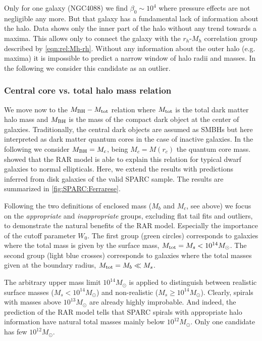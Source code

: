 Only for one galaxy (NGC4088) we find $\beta_0 \sim 10^{4}$ where pressure effects are not negligible any more. But that galaxy has a fundamental lack of information about the halo. Data shows only the inner part of the halo without any trend towards a maxima. This allows only to connect the galaxy with the $r_h$-$M_h$ correlation group described by \cref{eqn:rel:Mh-rh}. Without any information about the outer halo (e.g. maxima) it is impossible to predict a narrow window of halo radii and masses. In the following we consider this candidate as an outlier.




\subsubsection{Central core vs. total halo mass relation}
We move now to the $M_{\rm BH} - M_{\rm tot}$ relation \citep{2002ApJ...578...90F,2011Natur.469..377K,2015ApJ...800..124B} where $M_{\rm tot}$ is the total dark matter halo mass and $M_{\rm BH}$ is the mass of the compact dark object at the center of galaxies. Traditionally, the central dark objects are assumed as SMBHs but here interpreted as dark matter quantum cores in the case of inactive galaxies. In the following we consider $M_{\rm BH} = M_c$, being $M_c = M(r_c)$ the quantum core mass. \citet{RAR-II} showed that the RAR model is able to explain this relation for typical dwarf galaxies to normal ellipticals. Here, we extend the results with predictions inferred from disk galaxies of the valid SPARC sample. The results are summarized in \cref{fig:SPARC:Ferrarese}.

Following the two definitions of enclosed mass ($M_b$ and $M_c$, see above) we focus on the \textit{appropriate} and \textit{inappropriate} groups, excluding flat tail fits and outliers, to demonstrate the natural benefits of the RAR model. Especially the importance of the cutoff parameter $W_0$. The first group (green circles) corresponds to galaxies where the total mass is given by the surface mass, $M_{\rm tot} = M_s < 10^{14} M_\odot$. The second group (light blue crosses) corresponds to galaxies where the total masses given at the boundary radius, $M_{\rm tot} = M_b \ll M_s$.

The arbitrary upper mass limit $10^{14} M_\odot$ is applied to distinguish between realistic surface masses ($M_s < 10^{14} M_\odot$) and non-realistic ($M_s \geq 10^{14} M_\odot$). Clearly, spirals with masses above $10^{13} M_\odot$ are already highly improbable. And indeed, the prediction of the RAR model tells that SPARC spirals with appropriate halo information have natural total masses mainly below $10^{12} M_\odot$. Only one candidate has few $10^{12} M_\odot$. 

